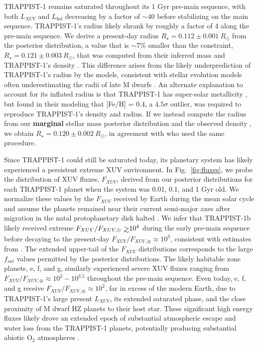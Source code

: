 \documentclass[twocolumn]{aastex62}
\def\gsim{~\rlap{$>$}{\lower 1.0ex\hbox{$\sim$}}}
\newcommand{\xxx}[1]{{\textbf{#1}}}
\begin{document}
TRAPPIST-1 remains saturated throughout its $1$ Gyr pre-main sequence, with both $L_{XUV}$ and $L_{bol}$ decreasing by a factor of ${\sim}40$ before stabilizing on the main sequence. TRAPPIST-1's radius likely shrank by roughly a factor of 4 along the pre-main sequence. We derive a present-day radius $R_{\star} = 0.112 \pm{0.001} \ R_{\odot}$ from the posterior distribution, a value that is ${\sim} 7\%$ smaller than the \citet{vanGrootel2018} constraint, $R_{\star} = 0.121 \pm {0.003} \ R_{\odot}$, that was computed from their inferred mass and TRAPPIST-1's density \citep{Delrez2018}. This difference arises from the likely underprediction of TRAPPIST-1's radius by the \citet{Baraffe2015} models, consistent with stellar evolution models often underestimating the radii of late M dwarfs \citep{Reid2005,Spada2013}. An alternate explanation to account for its inflated radius is that TRAPPIST-1 has super-solar metallicity \citep{Burgasser2017,vanGrootel2018}, but \citet{vanGrootel2018} found in their modeling that [Fe/H] = 0.4, a $4.5\sigma$ outlier, was required to reproduce TRAPPIST-1's density and radius. If we instead compute the radius from our \xxx{marginal} stellar mass posterior distribution and the observed density \citep{Delrez2018}, we obtain $R_{\star} = 0.120 \pm{0.002} \ R_{\odot}$, in agreement with \citet{vanGrootel2018} who used the same procedure.

Since TRAPPIST-1 could still be saturated today, its planetary system has likely experienced a persistent extreme XUV environment. In Fig.~\ref{fig:fluxes}, we probe the distribution of XUV fluxes, $F_{XUV}$, derived from our posterior distributions for each TRAPPIST-1 planet when the system was 0.01, 0.1, and 1 Gyr old. We normalize these values by the $F_{XUV}$ received by Earth during the mean solar cycle \citep[$F_{XUV,\oplus} = 3.88$ erg s$^{-1}$cm$^{-2}$,][]{Ribas2005} and assume the planets remained near their current semi-major axes after migration in the natal protoplanetary disk halted \citep{Luger2017}. We infer that TRAPPIST-1b likely received extreme $F_{XUV}/F_{XUV, \oplus} \gsim 10^4$ during the early pre-main sequence before decaying to the present-day $F_{XUV}/F_{XUV, \oplus} \approx 10^3$, consistent with estimates from \citet{Wheatley2017}. The extended upper-tail of the $F_{XUV}$ distributions corresponds to the large $f_{sat}$ values permitted by the posterior distributions. The likely habitable zone planets, e, f, and g, similarly experienced severe XUV fluxes ranging from $F_{XUV}/F_{XUV, \oplus} \approx 10^2 - 10^{3.5}$ throughout the pre-main sequence. Even today, e, f, and g receive $F_{XUV}/F_{XUV, \oplus} \approx 10^2$, far in excess of the modern Earth, due to TRAPPIST-1's large present $L_{XUV}$, its extended saturated phase, and the close proximity of M dwarf HZ planets to their host star. These significant high energy fluxes likely drove an extended epoch of substantial atmospheric escape and water loss from the TRAPPIST-1 planets, potentially producing substantial abiotic O$_2$ atmospheres \citep{Luger2015,Bolmont2017,Bourrier2017a}.
\end{document}
